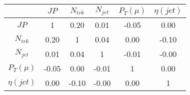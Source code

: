 \begin{tabular}{|c|c|c|c|c|c|} 
\hline
 & $JP$ & $N_{trk}$ & $N_{jet}$ & $P_{T} (\mu)$ & $\eta (jet)$ \\ \hline
$JP$ & 1 & 0.20 & 0.01 & -0.05 & 0.00 \\
$N_{trk}$ & 0.20 & 1 & 0.04 & 0.00 & -0.10 \\
$N_{jet}$ & 0.01 & 0.04 & 1 & -0.01 & -0.00 \\
$P_{T} (\mu)$ & -0.05 & 0.00 & -0.01 & 1 & 0.00 \\
$\eta (jet)$ & 0.00 & -0.10 & -0.00 & 0.00 & 1 \\
\hline 
\end{tabular} 


